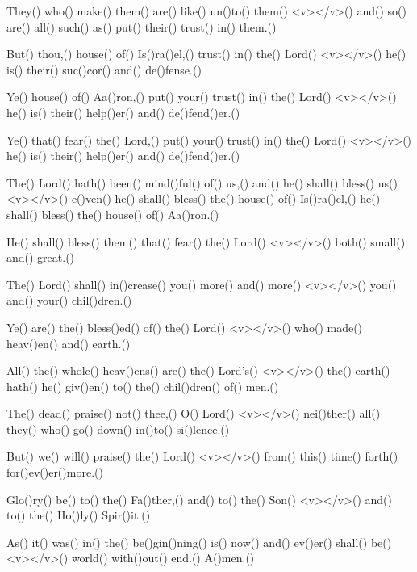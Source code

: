 They() who() make() them() are() like() un()to() them() <v>\greheightstar</v>() and() so() are() all() such() as() put() their() trust() in() them.()

But() thou,() house() of() Is()ra()el,() trust() in() the() Lord() <v>\greheightstar</v>() he() is() their() suc()cor() and() de()fense.()

Ye() house() of() Aa()ron,() put() your() trust() in() the() Lord() <v>\greheightstar</v>() he() is() their() help()er() and() de()fend()er.()

Ye() that() fear() the() Lord,() put() your() trust() in() the() Lord() <v>\greheightstar</v>() he() is() their() help()er() and() de()fend()er.()

The() Lord() hath() been() mind()ful() of() us,() and() he() shall() bless() us() <v>\greheightstar</v>() e()ven() he() shall() bless() the() house() of() Is()ra()el,() he() shall() bless() the() house() of() Aa()ron.()

He() shall() bless() them() that() fear() the() Lord() <v>\greheightstar</v>() both() small() and() great.()

The() Lord() shall() in()crease() you() more() and() more() <v>\greheightstar</v>() you() and() your() chil()dren.()

Ye() are() the() bless()ed() of() the() Lord() <v>\greheightstar</v>() who() made() heav()en() and() earth.()

All() the() whole() heav()ens() are() the() Lord's() <v>\greheightstar</v>() the() earth() hath() he() giv()en() to() the() chil()dren() of() men.()

The() dead() praise() not() thee,() O() Lord() <v>\greheightstar</v>() nei()ther() all() they() who() go() down() in()to() si()lence.()

But() we() will() praise() the() Lord() <v>\greheightstar</v>() from() this() time() forth() for()ev()er()more.()

Glo()ry() be() to() the() Fa()ther,() and() to() the() Son() <v>\greheightstar</v>() and() to() the() Ho()ly() Spir()it.()

As() it() was() in() the() be()gin()ning() is() now() and() ev()er() shall() be() <v>\greheightstar</v>() world() with()out() end.() A()men.()
